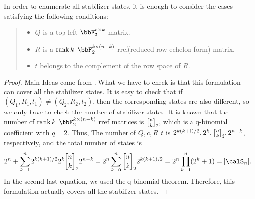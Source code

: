\documentclass[\main/main]{subfiles}
\begin{document}
\begin{theorem}
    In order to enumerate all stabilizer states,
    it is enough to consider the cases satisfying the following conditions:
    \begin{quote}
        \begin{itemize}
            \item $Q$ is a top-left $\bbF_2^{k \times k}$ matrix.
            \item $R$ is a $\rank{k}$ $\bbF_2^{k \times (n-k)}$ rref(reduced row echelon form) matrix.
            \item $t$ belongs to the complement of the row space of $R$.
        \end{itemize}
    \end{quote}
\end{theorem}
\begin{proof}
    Main Ideas come from \cite{struchalinExperimentalEstimationQuantum2021b}.
    What we have to check is that
    this formulation can cover all the stabilizer states.
    It is easy to check that if $(Q_1, R_1, t_1) \neq (Q_2, R_2, t_2)$,
    then the corresponding states are also different,
    so we only have to check the number of stabilizer states.
    It is known that the number of $\rank k$ $\bbF_2^{k \times (n-k)}$ rref matrices is
    $\qBinom{n}{k}_2$, which is a q-binomial coefficient with $q=2$.
    Thus, The number of $Q,c,R,t$ is
    $2^{k(k+1)/2},2^k,\qBinom{n}{k}_2,2^{n-k}$, respectively,
    and the total number of states is
    \begin{equation*}
        2^n + \sum_{k=1}^{n} 2^{k(k+1)/2} 2^k \qBinom{n}{k}_2 2^{n-k} \\
        = 2^n \sum_{k=0}^{n} \qBinom{n}{k}_2 2^{k(k+1)/2}               \\
        = 2^n \prod_{k=1}^{n} (2^k+1)
        = \abs{\calS_n}.
    \end{equation*}
    In the second last equation, we used the q-binomial theorem.
    Therefore, this formulation actually covers all the stabilizer states.
\end{proof}
\end{document}
